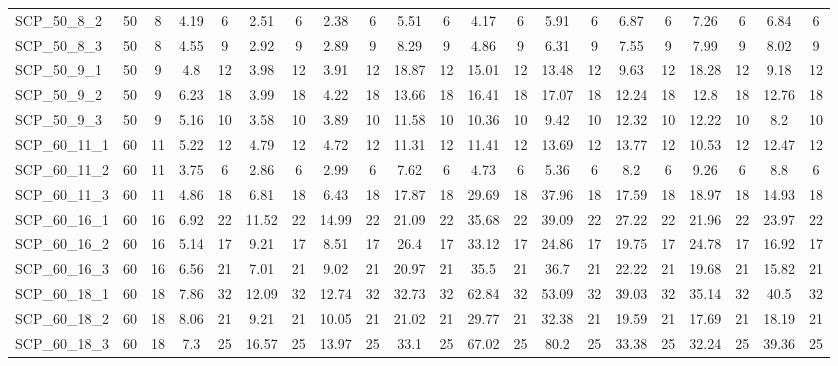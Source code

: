 \begin{sidewaystable}[!ht]
{\begin{tabular}{lcccccccccccccccccccc}
SCP\_50\_8\_2 & 50 & 8 & 4.19 & 6 & 2.51 & 6 &  \textcolor{blue2}{2.38} & 6 & 5.51 & 6 & 4.17 & 6 & 5.91 & 6 & 6.87 & 6 & 7.26 & 6 & 6.84 & 6 \\
SCP\_50\_8\_3 & 50 & 8 & 4.55 & 9 & 2.92 & 9 &  \textcolor{blue2}{2.89} & 9 & 8.29 & 9 & 4.86 & 9 & 6.31 & 9 & 7.55 & 9 & 7.99 & 9 & 8.02 & 9 \\
SCP\_50\_9\_1 & 50 & 9 & 4.8 & 12 & 3.98 & 12 &  \textcolor{blue2}{3.91} & 12 & 18.87 & 12 & 15.01 & 12 & 13.48 & 12 & 9.63 & 12 & 18.28 & 12 & 9.18 & 12 \\
SCP\_50\_9\_2 & 50 & 9 & 6.23 & 18 &  \textcolor{blue2}{3.99} & 18 & 4.22 & 18 & 13.66 & 18 & 16.41 & 18 & 17.07 & 18 & 12.24 & 18 & 12.8 & 18 & 12.76 & 18 \\
SCP\_50\_9\_3 & 50 & 9 & 5.16 & 10 &  \textcolor{blue2}{3.58} & 10 & 3.89 & 10 & 11.58 & 10 & 10.36 & 10 & 9.42 & 10 & 12.32 & 10 & 12.22 & 10 & 8.2 & 10 \\
SCP\_60\_11\_1 & 60 & 11 & 5.22 & 12 & 4.79 & 12 &  \textcolor{blue2}{4.72} & 12 & 11.31 & 12 & 11.41 & 12 & 13.69 & 12 & 13.77 & 12 & 10.53 & 12 & 12.47 & 12 \\
SCP\_60\_11\_2 & 60 & 11 & 3.75 & 6 &  \textcolor{blue2}{2.86} & 6 & 2.99 & 6 & 7.62 & 6 & 4.73 & 6 & 5.36 & 6 & 8.2 & 6 & 9.26 & 6 & 8.8 & 6 \\
SCP\_60\_11\_3 & 60 & 11 &  \textcolor{blue2}{4.86} & 18 & 6.81 & 18 & 6.43 & 18 & 17.87 & 18 & 29.69 & 18 & 37.96 & 18 & 17.59 & 18 & 18.97 & 18 & 14.93 & 18 \\
SCP\_60\_16\_1 & 60 & 16 &  \textcolor{blue2}{6.92} & 22 & 11.52 & 22 & 14.99 & 22 & 21.09 & 22 & 35.68 & 22 & 39.09 & 22 & 27.22 & 22 & 21.96 & 22 & 23.97 & 22 \\
SCP\_60\_16\_2 & 60 & 16 &  \textcolor{blue2}{5.14} & 17 & 9.21 & 17 & 8.51 & 17 & 26.4 & 17 & 33.12 & 17 & 24.86 & 17 & 19.75 & 17 & 24.78 & 17 & 16.92 & 17 \\
SCP\_60\_16\_3 & 60 & 16 &  \textcolor{blue2}{6.56} & 21 & 7.01 & 21 & 9.02 & 21 & 20.97 & 21 & 35.5 & 21 & 36.7 & 21 & 22.22 & 21 & 19.68 & 21 & 15.82 & 21 \\
SCP\_60\_18\_1 & 60 & 18 &  \textcolor{blue2}{7.86} & 32 & 12.09 & 32 & 12.74 & 32 & 32.73 & 32 & 62.84 & 32 & 53.09 & 32 & 39.03 & 32 & 35.14 & 32 & 40.5 & 32 \\
SCP\_60\_18\_2 & 60 & 18 &  \textcolor{blue2}{8.06} & 21 & 9.21 & 21 & 10.05 & 21 & 21.02 & 21 & 29.77 & 21 & 32.38 & 21 & 19.59 & 21 & 17.69 & 21 & 18.19 & 21 \\
SCP\_60\_18\_3 & 60 & 18 &  \textcolor{blue2}{7.3} & 25 & 16.57 & 25 & 13.97 & 25 & 33.1 & 25 & 67.02 & 25 & 80.2 & 25 & 33.38 & 25 & 32.24 & 25 & 39.36 & 25 \\

\end{tabular}}
\end{sidewaystable}
